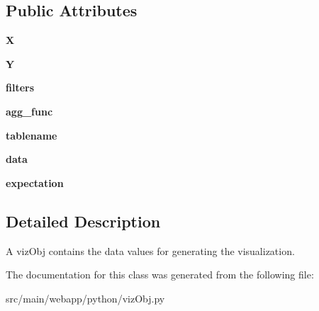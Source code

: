\subsection*{Public Attributes}
\begin{DoxyCompactItemize}
\item 
\mbox{\label{classpython_1_1viz_obj_1_1viz_obj_ad13072d3bd38efda7d9de6b5544191e3}} 
{\bfseries X}
\item 
\mbox{\label{classpython_1_1viz_obj_1_1viz_obj_a34a779f765ba668a6d1682ba6f3b1a69}} 
{\bfseries Y}
\item 
\mbox{\label{classpython_1_1viz_obj_1_1viz_obj_af8dc694bc9d0a03f8ac19015cdb22138}} 
{\bfseries filters}
\item 
\mbox{\label{classpython_1_1viz_obj_1_1viz_obj_a291169578b78a607027956e11c11bef5}} 
{\bfseries agg\+\_\+func}
\item 
\mbox{\label{classpython_1_1viz_obj_1_1viz_obj_a09af795d6da1ed204e37a827763762bf}} 
{\bfseries tablename}
\item 
\mbox{\label{classpython_1_1viz_obj_1_1viz_obj_a5cb7519971b7d5a2607fa63ba536c08d}} 
{\bfseries data}
\item 
\mbox{\label{classpython_1_1viz_obj_1_1viz_obj_a05edc6424bddb9aeb0016dc4ead16d93}} 
{\bfseries expectation}
\end{DoxyCompactItemize}


\subsection{Detailed Description}
\begin{DoxyVerb}A vizObj contains the data values for generating the visualization.
\end{DoxyVerb}
 

The documentation for this class was generated from the following file\+:\begin{DoxyCompactItemize}
\item 
src/main/webapp/python/viz\+Obj.\+py\end{DoxyCompactItemize}
